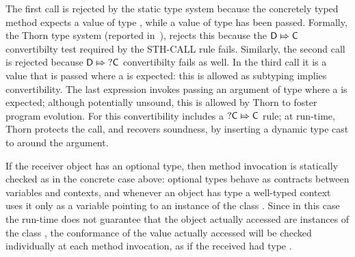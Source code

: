\documentclass[acmlarge, anonymous, authordraft]{acmart}
\begin{document}
\noindent The first call is rejected by the static type system because the concretely typed method \n expects a value of type \C, while a value of type \D has been passed.  Formally, the Thorn type system (reported in~), rejects this because the \({\sf{D}}\Mapsto{\sf{C}}\) convertibilty test required by the STH-CALL rule fails.  Similarly, the second call is rejected because \({\sf{D}}\Mapsto{\sf{?}}{\sf{C}}\) convertibilty fails as well.
In the third call it is a \C value that is passed where a \dt\C is expected: this is allowed as subtyping implies convertibility.  The last expression invokes \n passing an argument of type \dt\C where a \C is expected; although potentially unsound, this is allowed by Thorn to foster program evolution.  For this convertibility includes a \({\sf{?}}{\sf{C}}\Mapsto{\sf{C}}\) rule; at run-time, Thorn protects the call, and recovers soundness, by inserting a dynamic type cast to \C around the argument.

If the receiver object has an optional type, then method invocation is statically checked as in the concrete case above:
 optional types behave as contracts between variables and contexts, and whenever an object has type \dt\C a well-typed context uses it only as a variable pointing to an instance of the class \C.  Since in this case the run-time does not guarantee that the object actually accessed are instances of the class \C, the conformance of the value actually accessed will be checked individually at each method invocation, as if the received had type \any.  
 
\end{document}
